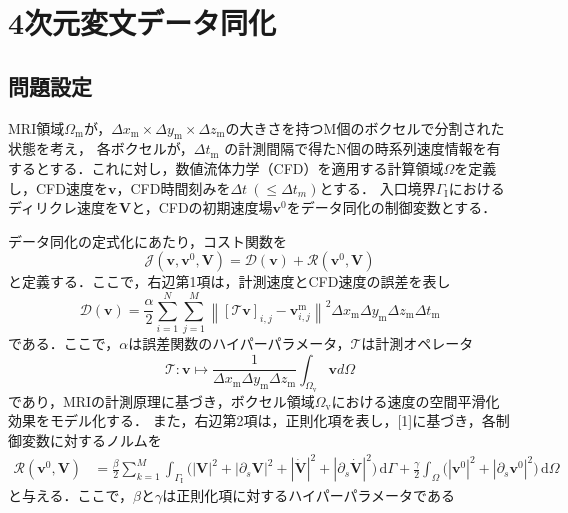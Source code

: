 \documentclass[a4paper,xelatex,ja=standard]{bxjsarticle}
\begin{document}
\section{4次元変文データ同化}

\subsection{問題設定}
MRI領域$\Omega_{\text{m}}$が，$\Delta x_{\text{m}} \times \Delta y_{\text{m}} \times \Delta z_{\text{m}}$の大きさを持つM個のボクセルで分割された状態を考え，
各ボクセルが，$\Delta t_{\text{m}}$ の計測間隔で得たN個の時系列速度情報を有するとする．これに対し，数値流体力学（CFD）を適用する計算領域$\Omega$を定義し，CFD速度を$\mathbf{v}$，CFD時間刻みを$\Delta t \ (\leq \Delta t_m)$とする．
入口境界$\Gamma_\mathrm{I}$におけるディリクレ速度を$\mathbf{V}$と，CFDの初期速度場$\mathbf{v}^0$をデータ同化の制御変数とする．

データ同化の定式化にあたり，コスト関数を
\begin{equation}
    \label{eq:cost_function}
    \mathcal{J}(\mathbf{v}, \mathbf{v}^{0}, \mathbf{V}) = \mathcal{D}(\mathbf{v}) + \mathcal{R}(\mathbf{v}^{0}, \mathbf{V})
\end{equation}
と定義する．ここで，右辺第1項は，計測速度とCFD速度の誤差を表し
\begin{equation}
    \label{eq:error_function}
    \mathcal{D}(\mathbf{v}) = 
    \frac{\alpha}{2} \sum_{i=1}^{N} \sum_{j=1}^{M} \left\|[\mathcal{T}\mathbf{v}]_{i, j}-\mathbf{v}_{i,j}^{\text{m}}\right\|^2 \Delta x_{\text{m}} \Delta y_{\text{m}} \Delta z_{\text{m}} \Delta t_{\text{m}} 
\end{equation}
である．ここで，$\alpha$は誤差関数のハイパーパラメータ，$\mathcal{T}$は計測オペレータ
\begin{equation}
    \mathcal{T} : \mathbf{v} \mapsto \frac{1}{\Delta x_{\text{m}} \Delta y_{\text{m}} \Delta z_{\text{m}}} \int_{\Omega_\text{v}} \mathbf{v} d \Omega
\end{equation}
であり，MRIの計測原理に基づき，ボクセル領域$\Omega_{\text{v}}$における速度の空間平滑化効果をモデル化する．
また，右辺第2項は，正則化項を表し，[1]に基づき，各制御変数に対するノルムを
\begin{equation}
    \label{eq:regularization}
    \begin{aligned}
    \mathcal{R}(\mathbf{v}^0, \mathbf{V}) 
    &= \frac{\beta}{2} \sum_{k=1}^{M} \int_{\Gamma_\mathrm{I}} \big( \left|\mathbf{V}\right|^2+\left|\partial_s \mathbf{V}\right|^2+\left|\dot{\mathbf{V}}\right|^2+\left|\partial_s \dot{\mathbf{V}}\right|^2 \big) \, \mathrm{d}\Gamma
    + \frac{\gamma}{2} \int_{\Omega}  \big( \left|\mathbf{v}^{0}\right|^2+\left|\partial_s \mathbf{v}^{0} \right|^2  \big) \, \mathrm{d}\Omega
    \end{aligned}
\end{equation}
と与える．ここで，$\beta$と$\gamma$は正則化項に対するハイパーパラメータである
\end{document}
